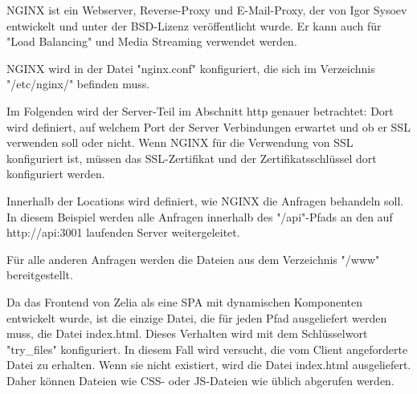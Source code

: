 
NGINX ist ein Webserver, Reverse-Proxy und E-Mail-Proxy, der von Igor Sysoev entwickelt und unter der BSD-Lizenz veröffentlicht wurde. Er kann auch für "Load Balancing" und Media Streaming verwendet werden.

\cite{WikiNginx}
\cite{nginx}

NGINX wird in der Datei "nginx.conf" konfiguriert, die sich im Verzeichnis "/etc/nginx/" befinden muss. 


Im Folgenden wird der Server-Teil im Abschnitt http genauer betrachtet:
Dort wird definiert, auf welchem Port der Server Verbindungen erwartet und ob er SSL verwenden soll oder nicht. Wenn NGINX für die Verwendung von SSL konfiguriert ist, müssen das SSL-Zertifikat und der Zertifikatsschlüssel dort konfiguriert werden.

Innerhalb der Locations wird definiert, wie NGINX die Anfragen behandeln soll.\\ In diesem Beispiel werden alle Anfragen innerhalb des "/api"-Pfads an den auf\\ http://api:3001 laufenden Server weitergeleitet.

Für alle anderen Anfragen werden die Dateien aus dem Verzeichnis "/www" bereitgestellt. 

Da das Frontend von Zelia als eine SPA mit dynamischen Komponenten entwickelt wurde, ist die einzige Datei, die für jeden Pfad ausgeliefert werden muss, die Datei index.html. Dieses Verhalten wird mit dem Schlüsselwort "try\_files" konfiguriert. In diesem Fall wird versucht, die vom Client angeforderte Datei zu erhalten. Wenn sie nicht existiert, wird die Datei index.html ausgeliefert. Daher können Dateien wie CSS- oder JS-Dateien wie üblich abgerufen werden.

